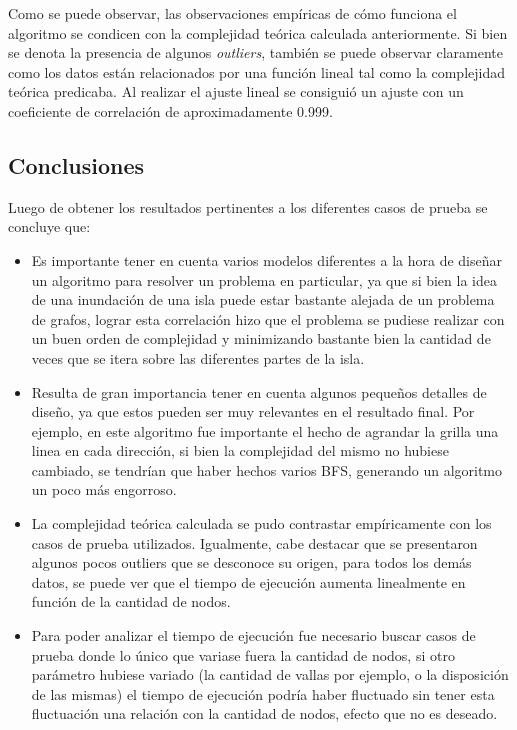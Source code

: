 \documentclass[a4paper, 12pt]{article}
\begin{document}
Como se puede observar, las observaciones empíricas de cómo funciona el algoritmo se condicen con la complejidad teórica
calculada anteriormente. Si bien se denota la presencia de algunos \emph{outliers}, también se puede observar claramente
como los datos están relacionados por una función lineal tal como la complejidad teórica predicaba. Al realizar el ajuste lineal
se consiguió un ajuste con un coeficiente de correlación de aproximadamente 0.999.

\subsection*{Conclusiones}
Luego de obtener los resultados pertinentes a los diferentes casos de prueba se concluye que:
\begin{itemize}
\item Es importante tener en cuenta varios modelos diferentes a la hora de dise\~{n}ar un algoritmo para resolver un problema
en particular, ya que si bien la idea de una inundación de una isla puede estar bastante alejada de un problema de grafos, lograr
esta correlación hizo que el problema se pudiese realizar con un buen orden de complejidad y minimizando bastante bien la cantidad de 
veces que se itera sobre las diferentes partes de la isla.
\item Resulta de gran importancia tener en cuenta algunos peque\~{n}os detalles de dise\~{n}o, ya que estos pueden ser muy
relevantes en el resultado final. Por ejemplo, en este algoritmo fue importante el hecho de agrandar la grilla una linea en cada dirección, si bien la complejidad del mismo no hubiese cambiado, se tendr\'ian que haber hechos varios BFS, generando un algoritmo un poco m\'as engorroso.
\item La complejidad teórica calculada se pudo contrastar empíricamente con los casos de prueba utilizados. Igualmente, 
cabe destacar que se presentaron algunos pocos outliers que se desconoce su origen, para todos los demás datos, se puede ver que
el tiempo de ejecución aumenta linealmente en función de la cantidad de nodos.
\item Para poder analizar el tiempo de ejecución fue necesario buscar casos de prueba donde lo único que variase fuera la cantidad de nodos,
si otro parámetro hubiese variado (la cantidad de vallas por ejemplo, o la disposición de las mismas) el tiempo de ejecución 
podría haber fluctuado sin tener esta fluctuación una relación con la cantidad de nodos, efecto que no es deseado. 
\end{itemize}
\end{document}
